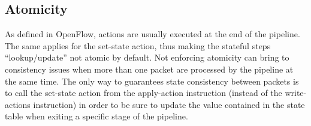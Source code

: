 \subsection{Atomicity}
As defined in OpenFlow, actions are usually executed at the end of the pipeline. The same applies for the set-state action, thus making the stateful steps ``lookup/update'' not atomic by default. Not enforcing atomicity can bring to consistency issues when more than one packet are processed by the pipeline at the same time. The only way to guarantees state consistency between packets is to call the set-state action from the apply-action instruction (instead of the write-actions instruction) in order to be sure to update the value contained in the state table when exiting a specific stage of the pipeline.